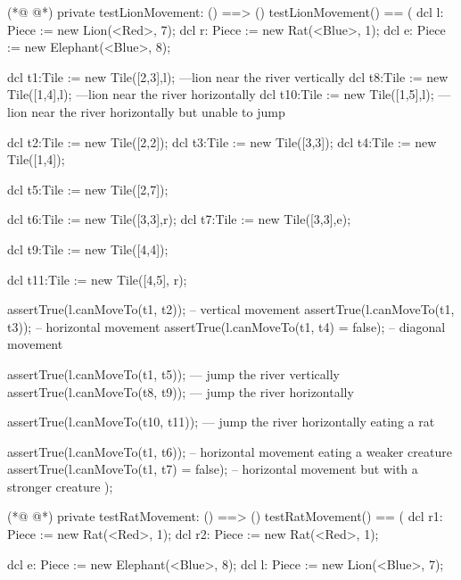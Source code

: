 \begin{vdmpp}[breaklines=true]
(*@
\label{testLionMovement:100}
@*)
     private testLionMovement: () ==> ()
         testLionMovement() ==
         (
                 dcl l: Piece := new Lion(<Red>, 7);
                 dcl r: Piece := new Rat(<Blue>, 1);
                 dcl e: Piece := new Elephant(<Blue>, 8);
                 
             dcl t1:Tile := new Tile([2,3],l); ---lion near the river vertically
             dcl t8:Tile := new Tile([1,4],l); ---lion near the river horizontally
             dcl t10:Tile := new Tile([1,5],l); ---lion near the river horizontally but unable to jump
             
             dcl t2:Tile := new Tile([2,2]);
             dcl t3:Tile := new Tile([3,3]);
             dcl t4:Tile := new Tile([1,4]);
             
             dcl t5:Tile := new Tile([2,7]);
             
             dcl t6:Tile := new Tile([3,3],r);
             dcl t7:Tile := new Tile([3,3],e);
             
             dcl t9:Tile := new Tile([4,4]);
             
             dcl t11:Tile := new Tile([4,5], r);
             
             assertTrue(l.canMoveTo(t1, t2)); -- vertical movement
             assertTrue(l.canMoveTo(t1, t3)); -- horizontal movement
             assertTrue(l.canMoveTo(t1, t4) = false); -- diagonal movement
             
             assertTrue(l.canMoveTo(t1, t5)); --- jump the river vertically
             assertTrue(l.canMoveTo(t8, t9)); --- jump the river horizontally
             
             assertTrue(l.canMoveTo(t10, t11)); --- jump the river horizontally eating a rat
             
             assertTrue(l.canMoveTo(t1, t6)); -- horizontal movement eating a weaker creature
             assertTrue(l.canMoveTo(t1, t7) = false); -- horizontal movement but with a stronger creature
  );
  
(*@
\label{testRatMovement:137}
@*)
       private testRatMovement: () ==> ()
         testRatMovement() ==
         (
                 dcl r1: Piece := new Rat(<Red>, 1);
                 dcl r2: Piece := new Rat(<Red>, 1);
                  
                 dcl e: Piece := new Elephant(<Blue>, 8);
                 dcl l: Piece := new Lion(<Blue>, 7);
                 

\end{vdmpp}
